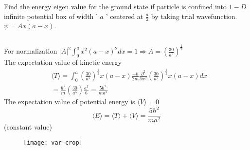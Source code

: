 \begin{exercise}
 Find the energy eigen value for the ground state if particle is confined into $1-D$ infinite potential box of width ' $a$ ' centered at $\frac{a}{2}$ by taking trial wavefunction. $\psi=A x(a-x)$.
\end{exercise}
\begin{answer}$\left. \right. $\\
	\begin{minipage}{0.5\textwidth}
	For normalization $|A|^{2} \int_{0}^{a} x^{2}(a-x)^{2} d x=1 \Rightarrow A=\left(\frac{30}{a^{5}}\right)^{\frac{1}{2}}$\\
	The expectation value of kinetic energy
	$$
	\begin{aligned}
	&\langle T\rangle=\int_{0}^{a}\left(\frac{30}{a^{5}}\right)^{\frac{1}{2}} x(a-x) \frac{-\hbar}{2 m} \frac{\partial^{2}}{\partial x^{2}}\left(\frac{30}{a^{5}}\right)^{\frac{1}{2}} x(a-x) d x \\
	&=\frac{\hbar^{2}}{m}\left(\frac{30}{a^{5}}\right) \frac{a^{3}}{6}=\frac{5 \hbar^{2}}{m a^{2}}
	\end{aligned}
	$$
	The expectation value of potential energy is $\langle V\rangle=0$
	$$
	\langle E\rangle=\langle T\rangle+\langle V\rangle=\frac{5 \hbar^{2}}{m a^{2}}
	$$
	(constant value)
	\end{minipage}
 \begin{minipage}{0.5\textwidth}
 \begin{figure}[H]
 	\centering
 	\texttt{[image: var-crop]}
 \end{figure}	
 \end{minipage}
\end{answer}
